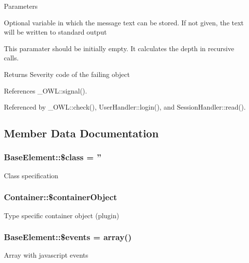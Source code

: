 \begin{DoxyParams}{Parameters}
\item[\mbox{\tt[out]} {\em \$text}]Optional variable in which the message text can be stored. If not given, the text will be written to standard output \item[\mbox{\tt[in]} {\em \$depth}]This paramater should be initially empty. It calculates the depth in recursive calls. \end{DoxyParams}
\begin{DoxyReturn}{Returns}
Severity code of the failing object 
\end{DoxyReturn}


References \_\-OWL::signal().



Referenced by \_\-OWL::check(), UserHandler::login(), and SessionHandler::read().



\subsection{Member Data Documentation}
\subsubsection[{\$class}]{\setlength{\rightskip}{0pt plus 5cm}BaseElement::\$class = ''}\label{classBaseElement_a99976a8e967db92e7800309f359b0803}
Class specification 
\subsubsection[{\$containerObject}]{\setlength{\rightskip}{0pt plus 5cm}Container::\$containerObject}\label{classContainer_a65102889a42244acc956c3ec6a52ffec}
Type specific container object (plugin) 
\subsubsection[{\$events}]{\setlength{\rightskip}{0pt plus 5cm}BaseElement::\$events = array()}\label{classBaseElement_a02cebe45d277b4ff8f29db08bad371ba}
Array with javascript events 


